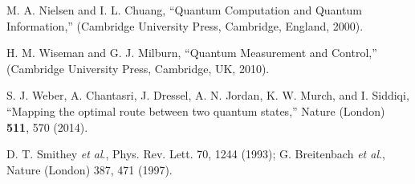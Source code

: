 \begin{singlespace}


\begin{thebibliography}{99}

 M. A. Nielsen and I. L. Chuang, ``Quantum Computation
and Quantum Information,'' (Cambridge University Press,
Cambridge, England, 2000).

 H. M. Wiseman and G. J. Milburn, ``Quantum Measurement and Control,'' (Cambridge University Press, Cambridge, UK, 2010).

 S. J. Weber, A. Chantasri, J. Dressel, A. N. Jordan, K. W. Murch, and I. Siddiqi, ``Mapping the optimal route between two quantum states,'' Nature (London) {\bf 511}, 570 (2014).


D. T. Smithey \textit{et al}., Phys. Rev. Lett. 70, 1244 (1993); G. Breitenbach \textit{et al}., Nature (London) 387, 471 (1997).



\end{thebibliography}
\end{singlespace}

